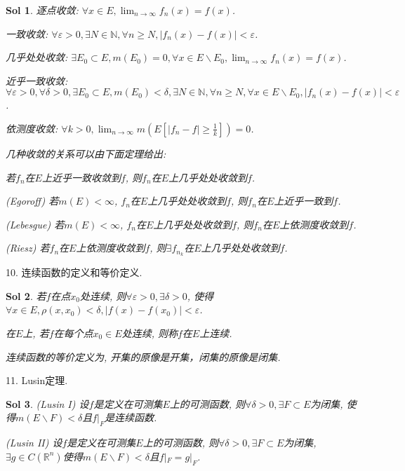 \documentclass[UTF8]{article}
\newtheorem{solution}{Sol}
\begin{document}
    \begin{solution}
        逐点收敛: $\forall x\in E, \lim_{n \to \infty}f_n(x)=f(x)$.\par
        一致收敛: $\forall \varepsilon>0, \exists N\in \mathbb{N}, \forall n\geqslant N, |f_n(x)-f(x)|<\varepsilon$.\par
        几乎处处收敛: $\exists E_0\subset E, m(E_0) = 0, \forall x\in E\backslash E_0, \lim_{n \to \infty}f_n(x)=f(x)$.\par
        近乎一致收敛: $\forall \varepsilon>0, \forall \delta > 0, \exists E_0\subset E, m(E_0) < \delta, \exists N\in \mathbb{N}, \forall n\geqslant N, \forall x\in E\backslash E_0, |f_n(x)-f(x)|<\varepsilon$.\par
        依测度收敛: $\forall k >0, \lim_{n \to \infty}m(E[|f_n-f|\geqslant \frac{1}{k}])=0$.\par
        几种收敛的关系可以由下面定理给出:\par
        若$f_n$在$E$上近乎一致收敛到$f$, 则$f_n$在$E$上几乎处处收敛到$f$.\par
        (Egoroff) 若$m(E)<\infty$, $f_n$在$E$上几乎处处收敛到$f$, 则$f_n$在$E$上近乎一致到$f$.\par
        (Lebesgue) 若$m(E)<\infty$, $f_n$在$E$上几乎处处收敛到$f$, 则$f_n$在$E$上依测度收敛到$f$.\par
        (Riesz) 若$f_n$在$E$上依测度收敛到$f$, 则$\exists f_{n_k}$在$E$上几乎处处收敛到$f$.\par
    \end{solution}
    10. 连续函数的定义和等价定义.\par
    \begin{solution}
        若$f$在点$x_0$处连续, 则$\forall \varepsilon > 0, \exists \delta > 0$, 使得$\forall x\in E, \rho(x,x_0)<\delta, |f(x)-f(x_0)|<\varepsilon$.\par
        在$E$上, 若$f$在每个点$x_0\in E$处连续, 则称$f$在$E$上连续.\par
        连续函数的等价定义为, 开集的原像是开集，闭集的原像是闭集.\par
    \end{solution}
    11. Lusin定理.\par
    \begin{solution}
        (Lusin I) 设$f$是定义在可测集$E$上的可测函数, 则$\forall \delta >0, \exists F\subset E$为闭集, 使得$m(E\backslash F)<\delta$且$f|_F$是连续函数.\par
        (Lusin II) 设$f$是定义在可测集$E$上的可测函数, 则$\forall \delta >0, \exists F\subset E$为闭集, $\exists g\in C(\mathbb{R}^n)$使得$m(E\backslash F)<\delta$且$f|_F=g|_F$.\par
    \end{solution}
\end{document}
